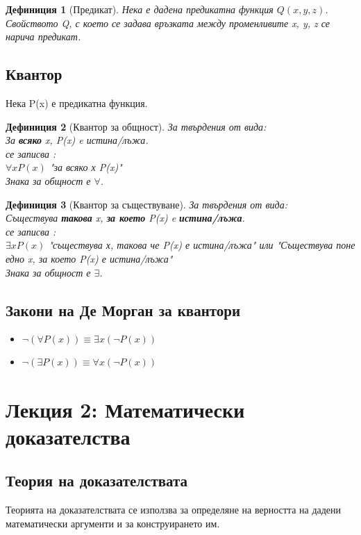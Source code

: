 \documentclass[fleqn, 12pt]{article}
\newtheorem{definition}{Дефиниция}[subsection]
\theoremstyle{definition}
\begin{document}
\begin{definition}[Предикат]
Нека е дадена предикатна функция $Q(x,y,z)$.\\
Свойството Q, с което се задава връзката между променливите x, y, z се нарича предикат.
\end{definition}

\subsection{Квантор}
Нека P(x) е предикатна функция.

\begin{definition}[Квантор за общност]
За твърдения от вида: \\
За \textbf{всяко} x, P(x) e истина/лъжа.\\
се записва : \\
$\forall x P(x)$ "за всяко х P(x)"\\
Знака за общност е $\forall$.
\end{definition}

\begin{definition}[Квантор за съществуване]
За твърдения от вида: \\
Съществува \textbf{такова} x, \textbf{за което} P(x) e \textbf{истина/лъжа}.\\
се записва : \\
$\exists x P(x)$ "съществува х, такова че P(x) е истина/лъжа" или "Съществува поне едно x, за което P(x) е истина/лъжа"\\
Знака за общност е $\exists$.
\end{definition}

\subsection{Закони на Де Морган за квантори}

\begin{itemize}
	\item $\neg (\forall P(x)) \equiv \exists x(\neg P(x))$
	\item $\neg (\exists P(x)) \equiv \forall x(\neg P(x))$
\end{itemize}

\newpage

\section{Лекция 2: Математически доказателства}

\subsection{Теория на доказателствата}
Теорията на доказателствата се използва за определяне на верността на дадени математически аргументи и за конструирането им. 
\end{document}
